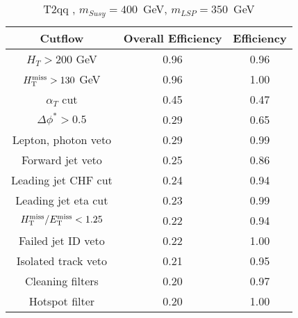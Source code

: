 \begin{longtable}{| c | c | c  | }
\caption{T2qq , $m_{Susy} = 400 $~GeV, $m_{LSP} = 350$~GeV} \label{tab: T2qq  400  350 } \\    \hline 
\textbf{Cutflow} & \textbf{Overall Efficiency} & \textbf{Efficiency}\\ \hline 
$H_{T} > 200$ GeV & 0.96 & 0.96\\ \hline 
$H_{\rm T}^{\rm miss} > 130$ GeV & 0.96 & 1.00\\ \hline 
$\alpha_{T}$ cut & 0.45 & 0.47\\ \hline 
$\Delta\phi^{*} > 0.5$ & 0.29 & 0.65\\ \hline 
Lepton, photon veto & 0.29 & 0.99\\ \hline 
Forward jet veto & 0.25 & 0.86\\ \hline 
Leading jet CHF cut & 0.24 & 0.94\\ \hline 
Leading jet eta cut & 0.23 & 0.99\\ \hline 
$H_{\rm T}^{\rm miss} / E_{\rm T}^{\rm miss} < 1.25$ & 0.22 & 0.94\\ \hline 
Failed jet ID veto & 0.22 & 1.00\\ \hline 
Isolated track veto & 0.21 & 0.95\\ \hline 
Cleaning filters & 0.20 & 0.97\\ \hline 
Hotspot filter & 0.20 & 1.00\\ \hline 
    \hline 
    \hline 
\end{longtable}
